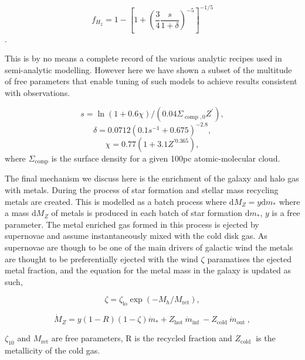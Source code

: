 \begin{equation}
    f_{H_{2}}=1-\left[1+\left(\frac{3}{4} \frac{s}{1+\delta}\right)^{-5}\right]^{-1 / 5}
\end{equation}.

This is by no means a complete record of the various analytic recipes used in semi-analytic modelling. However here we have shown a subset of the multitude of free parameters that enable tuning of such models to achieve results consistent with observations.

\begin{equation}
s=\ln (1+0.6 \chi) /\left(0.04 \Sigma_{\operatorname{comp}, 0} Z^{\prime}\right),
\end{equation}
\begin{equation}
\delta=0.0712\left(0.1 s^{-1}+0.675\right)^{-2.8},
\end{equation}
\begin{equation}
\chi=0.77\left(1+3.1 Z^{\prime0.365}\right),
\end{equation}
where $\Sigma_{\operatorname{comp}}$ is the surface density for a given 100pc atomic-molecular cloud.

The final mechanism we discuss here is the enrichment of the galaxy and halo gas with metals. During the process of star formation and stellar mass recycling metals are created. This is modelled as a batch process where $\mathrm{d} M_{Z}=y \mathrm{d} m_{*}$ where a mass $\mathrm{d} M_{Z}$ of metals is produced in each batch of star formation $\mathrm{d} m_{*}$, $y$ is a free parameter. The metal enriched gas formed in this process is ejected by supernovae and assume instantaneously mixed with the cold disk gas. As supernovae are though to be one of the main drivers of galactic wind the metals are thought to be preferentially ejected with the wind $\zeta$ paramatises the ejected metal fraction, and the equation for the metal mass in the galaxy is updated as such,

\begin{equation}
\zeta=\zeta_{\mathrm{lo}} \exp \left(-M_{h} / M_{\mathrm{ret}}\right),
\end{equation}

\begin{equation}
\dot{M}_{Z}=y(1-R)(1-\zeta) \dot{m}_{*}+Z_{\text {hot }} \dot{m}_{\text {inf }}-Z_{\text {cold }} \dot{m}_{\text {out }},
\end{equation}

$\zeta_{10}$ and $M_{\mathrm{ret}}$ are free parameters, R is the recycled fraction and $Z_{\text {cold }}$ is the metallicity of the cold gas.


